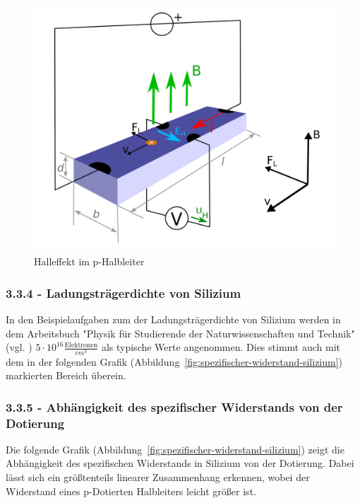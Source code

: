 \documentclass[a4paper]{scrartcl}
\numberwithin{equation}{subsection}
\begin{document}
\begin{figure}[H]
\includegraphics[width=12cm]{p-Halbleiter_Hall-Effekt}
\centering
\caption{Halleffekt im p-Halbleiter}
\centering
\label{fig:halleffekt-p-halbleiter}
\end{figure}

\subsubsection{3.3.4 - Ladungsträgerdichte von Silizium}
In den Beispielaufgaben zum der Ladungsträgerdichte von Silizium werden in dem Arbeitsbuch "Physik für Studierende der Naturwissenschaften und Technik" (vgl. \cite{tipler}) $5 \cdot 10^{16} \frac{\text{Elektronen}}{cm^3}$ als typische Werte angenommen. Dies stimmt auch mit dem in der folgenden Grafik (Abbildung~\ref{fig:spezifischer-widerstand-silizium}) markierten Bereich überein.

\subsubsection{3.3.5 - Abhängigkeit des spezifischer Widerstands von der Dotierung}
Die folgende Grafik (Abbildung~\ref{fig:spezifischer-widerstand-silizium}) zeigt die Abhängigkeit des spezifischen Widerstands in Silizium von der Dotierung. 
Dabei lässt sich ein größtenteils linearer Zusammenhang erkennen, wobei der Widerstand eines p-Dotierten Halbleiters leicht größer ist.
\end{document}
